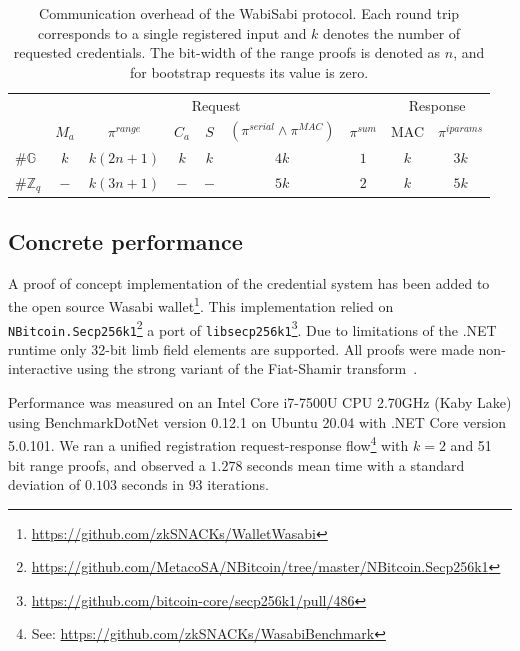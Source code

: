 \documentclass[a4paper]{article}
\begin{document}
\begin{table}[h!]
\centering
\begin{tabular}{l|cccccc|cc}
                 & \multicolumn{6}{c|}{Request}                                                                                            & \multicolumn{2}{c}{Response}   \\
                 & $M_a$ & $\pi^{\textit{range}}$ & $C_a$ & $S$ & $(\pi^{\textit{serial}} \land \pi^{\textit{MAC}})
                 $ & $\pi^{\textit{sum}}$ & MAC & $\pi^{\textit{iparams}}$ \\
$\#\mathbb{G}$   & $k$   & $k(2n + 1)$            & $k$   & $k$ & $4k$                                             & $1$                  & $k$ & $3k$                     \\
$\#\mathbb{Z}_q$ & $-$   & $k(3n + 1)$            & $-$   & $-$ & $5k$                                             & $2$                  & $k$ & $5k$
\end{tabular}

  \caption{Communication overhead of the WabiSabi protocol. Each round trip corresponds to a single registered input and $k$ denotes the number of requested credentials. The bit-width of the range proofs is denoted as $n$, and for bootstrap requests its value is zero.}\label{tab:protocolefficiency}
\end{table}

\subsection{Concrete performance}

A proof of concept implementation of the credential system has been added to the open source Wasabi wallet\footnote{\url{https://github.com/zkSNACKs/WalletWasabi}}. This implementation relied on \texttt{NBitcoin.Secp256k1}\footnote{\url{https://github.com/MetacoSA/NBitcoin/tree/master/NBitcoin.Secp256k1}} a port of \texttt{libsecp256k1}\footnote{\url{https://github.com/bitcoin-core/secp256k1/pull/486}}. Due to limitations of the .NET runtime only 32-bit limb field elements are supported. All proofs were made non-interactive using the strong variant of the Fiat-Shamir transform~\cite{fiat1987prove, bernhard2012not, hamburg2017strobe}.

Performance was measured on an Intel Core i7-7500U CPU 2.70GHz (Kaby Lake) using BenchmarkDotNet version 0.12.1 on Ubuntu 20.04 with .NET Core version 5.0.101. We ran a unified registration request-response flow\footnote{See: \url{https://github.com/zkSNACKs/WasabiBenchmark}}  with $k=2$ and 51 bit range proofs, and observed a $1.278$ seconds mean time with a standard deviation of $0.103$ seconds in $93$ iterations.
\end{document}
